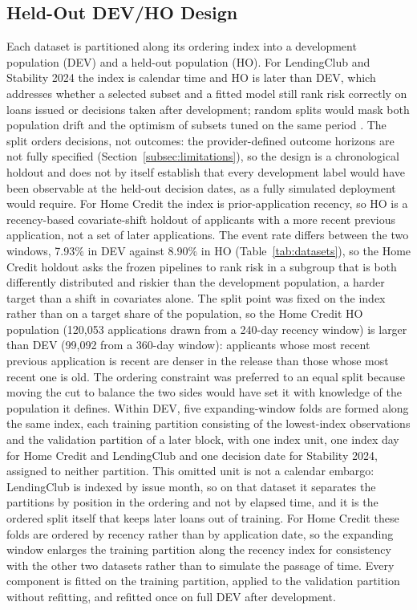 \documentclass[final,5p,twocolumn]{elsarticle}
\providecommand{\DIFaddend}{} %
\begin{document}
\DIFaddend \subsection{Held-Out DEV/HO Design}
\label{subsec:dev_oot}

Each dataset is partitioned along its ordering index into a development population (DEV) and a held-out population (HO). For LendingClub and Stability 2024 the index is calendar time and HO is later than DEV, which addresses whether a selected subset and a fitted model still rank risk correctly on loans issued or decisions taken after development; random splits would mask both population drift and the optimism of subsets tuned on the same period \cite{bergmeir2012,gama2014}. The split orders decisions, not outcomes: the provider-defined outcome horizons are not fully specified (Section~\ref{subsec:limitations}), so the design is a chronological holdout and does not by itself establish that every development label would have been observable at the held-out decision dates, as a fully simulated deployment would require. For Home Credit the index is prior-application recency, so HO is a recency-based covariate-shift holdout of applicants with a more recent previous application, not a set of later applications. The event rate differs between the two windows, 7.93\% in DEV against 8.90\% in HO (Table~\ref{tab:datasets}), so the Home Credit holdout asks the frozen pipelines to rank risk in a subgroup that is both differently distributed and riskier than the development population, a harder target than a shift in covariates alone. The split point was fixed on the index rather than on a target share of the population, so the Home Credit HO population (120,053 applications drawn from a 240-day recency window) is larger than DEV (99,092 from a 360-day window): applicants whose most recent previous application is recent are denser in the release than those whose most recent one is old. The ordering constraint was preferred to an equal split because moving the cut to balance the two sides would have set it with knowledge of the population it defines. Within DEV, five expanding-window folds are formed along the same index, each training partition consisting of the lowest-index observations and the validation partition of a later block, with one index unit, one index day for Home Credit and LendingClub and one decision date for Stability 2024, assigned to neither partition. This omitted unit is not a calendar embargo: LendingClub is indexed by issue month, so on that dataset it separates the partitions by position in the ordering and not by elapsed time, and it is the ordered split itself that keeps later loans out of training. For Home Credit these folds are ordered by recency rather than by application date, so the expanding window enlarges the training partition along the recency index for consistency with the other two datasets rather than to simulate the passage of time. Every component is fitted on the training partition, applied to the validation partition without refitting, and refitted once on full DEV after development.
\end{document}
